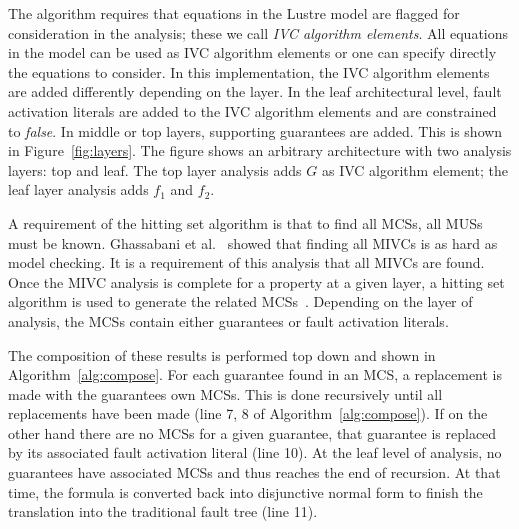 The \aivcalg algorithm requires that equations in the Lustre model are flagged for consideration in the analysis; these we call \emph{IVC algorithm elements}. All equations in the model can be used as IVC algorithm elements or one can specify directly the equations to consider. In this implementation, the IVC algorithm elements are added differently depending on the layer. In the leaf architectural level, fault activation literals are added to the IVC algorithm elements and are constrained to {\em false}. In middle or top layers, supporting guarantees are added. This is shown in Figure~\ref{fig:layers}. The figure shows an arbitrary architecture with two analysis layers: top and leaf. The top layer analysis adds $G$ as IVC algorithm element; the leaf layer analysis adds $f_1$ and $f_2$. 

A requirement of the hitting set algorithm is that to find all MCSs, all MUSs must be known. Ghassabani et al.~\cite{Ghassabani2017EfficientGO} showed that finding all MIVCs is as hard as model checking. It is a requirement of this analysis that all MIVCs are found. Once the MIVC analysis is complete for a property at a given layer, a hitting set algorithm is used to generate the related MCSs~\cite{murakami2013efficient}. Depending on the layer of analysis, the MCSs contain either guarantees or fault activation literals.


The composition of these results is performed top down and shown in Algorithm~\ref{alg:compose}. For each guarantee found in an MCS, a replacement is made with the guarantees own MCSs. This is done recursively until all replacements have been made (line 7, 8 of Algorithm~\ref{alg:compose}). If on the other hand there are no MCSs for a given guarantee, that guarantee is replaced by its associated fault activation literal (line 10). At the leaf level of analysis, no guarantees have associated MCSs and thus reaches the end of recursion. At that time, the formula is converted back into disjunctive normal form to finish the translation into the traditional fault tree (line 11). 

